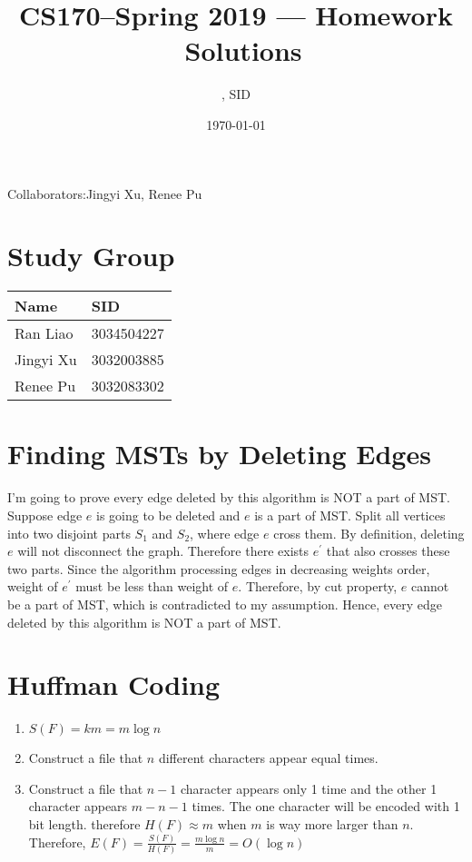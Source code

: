 \documentclass[11pt]{article}
\title{CS170--Spring 2019 --- Homework \Homework\ Solutions}
\author{\Name, SID \SID}
\date{\today}
\newenvironment{qparts}{\begin{enumerate}[{(}a{)}]}{\end{enumerate}}
\begin{document}
\maketitle
Collaborators:Jingyi Xu, Renee Pu

\section{Study Group}
	\begin{tabular}{ll}
		Name		&   SID         		\\\hline
		Ran Liao		&   3034504227  	\\  
		Jingyi Xu		&   3032003885  	\\
		Renee Pu		&   3032083302  	\\
	\end{tabular}



\newpage
\section{Finding MSTs by Deleting Edges}

	I'm going to prove every edge deleted by this algorithm is NOT a part of MST. Suppose edge $e$ is going to be deleted and $e$ is a part of MST. Split all vertices into two disjoint parts $S_1$ and $S_2$, where edge $e$ cross them. By definition, deleting $e$ will not disconnect the graph. Therefore there exists $e^\prime$ that also crosses these two parts. Since the algorithm processing edges in decreasing weights order, weight of $e^\prime$ must be less than weight of $e$. Therefore, by cut property, $e$ cannot be a part of MST, which is contradicted to my assumption. Hence, every edge deleted by this algorithm is NOT a part of MST.
	
\newpage
\section{Huffman Coding}
\begin{qparts}
	\item 
	
	$S(F) = km = m \log n$
	
	\item 
	
	Construct a file that $n$ different characters appear equal times.
	
	\item
	
	Construct a file that $n-1$ character appears only 1 time and the other 1 character appears $m - n - 1$ times. The one character will be encoded with 1 bit length. therefore $H(F) \approx m$ when $m$ is way more larger than $n$. Therefore, $E(F) = \frac{S(F)}{H(F)} = \frac {m \log n} {m} = O(\log n)$

\end{qparts}
\end{document}
